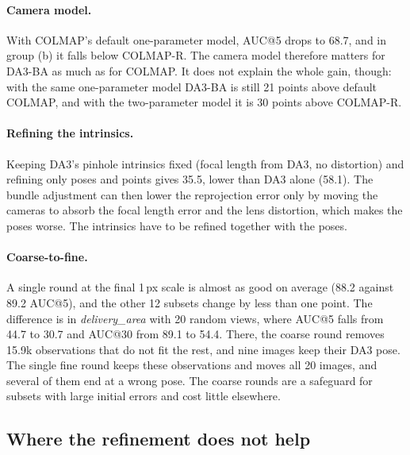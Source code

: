 \documentclass[10pt,twocolumn,letterpaper]{article}
\begin{document}
\paragraph{Camera model.} With COLMAP's default one-parameter model, AUC@5 drops to 68.7, and in group (b) it
falls below COLMAP-R. The camera model therefore matters for DA3-BA as much as for COLMAP. It does not explain the
whole gain, though: with the same one-parameter model DA3-BA is still 21 points above default COLMAP, and with the
two-parameter model it is 30 points above COLMAP-R.

\paragraph{Refining the intrinsics.} Keeping DA3's pinhole intrinsics fixed (focal length from DA3, no
distortion) and refining only poses and points gives 35.5, lower than DA3 alone (58.1). The bundle adjustment can
then lower the reprojection error only by moving the cameras to absorb the focal length error and the lens
distortion, which makes the poses worse. The intrinsics have to be refined together with the poses.

\paragraph{Coarse-to-fine.} A single round at the final 1\,px scale is almost as good on average (88.2 against
89.2 AUC@5), and the other 12 subsets change by less than one point. The difference is in \emph{delivery\_area} with 20 random
views, where AUC@5 falls from 44.7 to 30.7 and AUC@30 from 89.1 to 54.4. There, the coarse round removes 15.9k observations that do not fit the
rest, and nine images keep their DA3 pose. The single fine round keeps these observations and moves all 20 images,
and several of them end at a wrong pose. The coarse rounds are a safeguard for subsets with large initial errors
and cost little elsewhere.

\subsection{Where the refinement does not help}
\label{sec:ba_fail}
\end{document}
